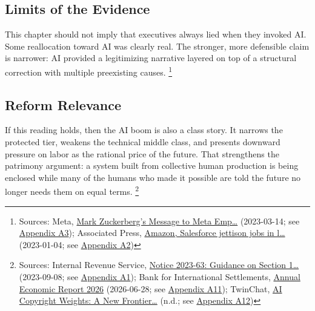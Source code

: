 \documentclass[
  american,
  11pt,
  letterpaper,
]{article}
\begin{document}
\subsection{Limits of the Evidence}\label{limits-of-the-evidence-5}

This chapter should not imply that executives always lied when they
invoked AI. Some reallocation toward AI was clearly real. The stronger,
more defensible claim is narrower: AI provided a legitimizing narrative
layered on top of a structural correction with multiple preexisting
causes. \footnote{Sources: Meta,
  \href{https://about.fb.com/news/2023/03/mark-zuckerberg-meta-year-of-efficiency/}{Mark
  Zuckerberg's Message to Meta Emp\ldots{}} (2023-03-14; see
  \hyperref[ch-05-appendix-a3-mark-zuckerberg-s-message-to-meta-employees]{Appendix
  A3}); Associated Press,
  \href{https://apnews.com/article/bbb2f3a09eafdfc7cda54a3b87e538ad}{Amazon,
  Salesforce jettison jobs in l\ldots{}} (2023-01-04; see
  \hyperref[ch-05-appendix-a2-amazon-salesforce-jettison-jobs-in-latest-tech-worker-purge]{Appendix
  A2})}

\subsection{Reform Relevance}\label{reform-relevance-5}

If this reading holds, then the AI boom is also a class story. It
narrows the protected tier, weakens the technical middle class, and
presents downward pressure on labor as the rational price of the future.
That strengthens the patrimony argument: a system built from collective
human production is being enclosed while many of the humans who made it
possible are told the future no longer needs them on equal terms.
\footnote{Sources: Internal Revenue Service,
  \href{https://www.irs.gov/pub/irs-drop/n-23-63.pdf}{Notice 2023-63:
  Guidance on Section 1\ldots{}} (2023-09-08; see
  \hyperref[ch-05-appendix-a1-notice-2023-63-guidance-on-section-174-and-specified-research-or-experimental-expenditures]{Appendix
  A1}); Bank for International Settlements,
  \href{https://www.bis.org/publ/arpdf/ar2026e.pdf}{Annual Economic
  Report 2026} (2026-06-28; see
  \hyperref[ch-05-appendix-a11-annual-economic-report-2026]{Appendix
  A11}); TwinChat,
  \href{https://medium.com/twinchat/ai-copyright-weights-a-new-frontier-in-intellectual-property-law-d8ee1b6c55ee}{AI
  Copyright Weights: A New Frontier\ldots{}} (n.d.; see
  \hyperref[ch-05-appendix-a12-ai-copyright-weights-a-new-frontier-in-intellectual-property-law]{Appendix
  A12})}
\end{document}
